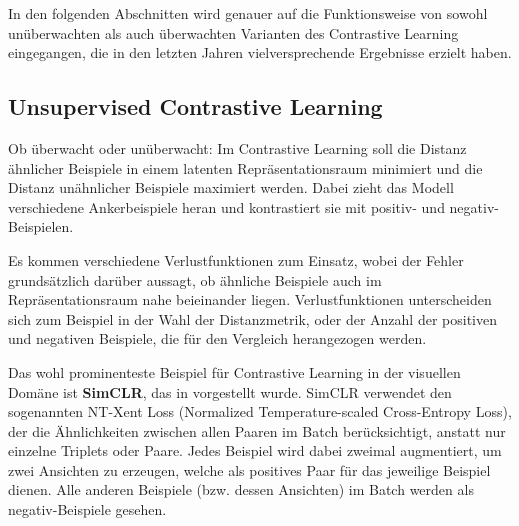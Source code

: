 In den folgenden Abschnitten wird genauer auf die Funktionsweise von sowohl unüberwachten als auch überwachten Varianten des Contrastive Learning eingegangen, die in den letzten Jahren vielversprechende Ergebnisse erzielt haben.

\subsection{Unsupervised Contrastive Learning} \label{subsec:unsup-contrastive}

Ob überwacht oder unüberwacht: Im Contrastive Learning soll die Distanz ähnlicher Beispiele in einem latenten Repräsentationsraum minimiert und die Distanz unähnlicher Beispiele maximiert werden. Dabei zieht das Modell verschiedene Ankerbeispiele heran und kontrastiert sie mit positiv- und negativ-Beispielen.

Es kommen verschiedene Verlustfunktionen zum Einsatz, wobei der Fehler grundsätzlich darüber aussagt, ob ähnliche Beispiele auch im Repräsentationsraum nahe beieinander liegen. Verlustfunktionen unterscheiden sich zum Beispiel in der Wahl der Distanzmetrik, oder der Anzahl der positiven und negativen Beispiele, die für den Vergleich herangezogen werden.

Das wohl prominenteste Beispiel für Contrastive Learning in der visuellen Domäne ist \textbf{SimCLR}, das in \parencite{Chen2020simclr} vorgestellt wurde. SimCLR verwendet den sogenannten NT-Xent Loss (Normalized Temperature-scaled Cross-Entropy Loss), der die Ähnlichkeiten zwischen allen Paaren im Batch berücksichtigt, anstatt nur einzelne Triplets oder Paare. Jedes Beispiel wird dabei zweimal augmentiert, um zwei Ansichten zu erzeugen, welche als positives Paar für das jeweilige Beispiel dienen. Alle anderen Beispiele (bzw. dessen Ansichten) im Batch werden als negativ-Beispiele gesehen.


